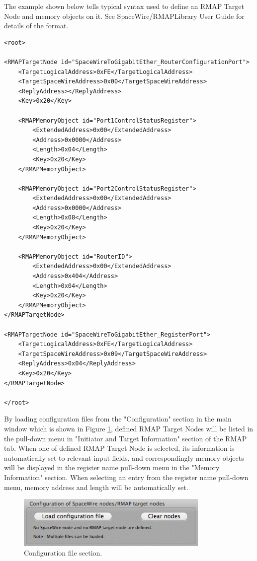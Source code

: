 \documentclass[a4paper,10pt]{article}
\begin{document}
The example shown below tells typical syntax used to define an RMAP Target Node and memory objects on it.  See SpaceWire/RMAPLibrary User Guide for details of the format.

\begin{lstlisting}[label=source:xml_configurationfile_example, caption=An example of an XML-like configuration file.]
<root>

<RMAPTargetNode id="SpaceWireToGigabitEther_RouterConfigurationPort">
	<TargetLogicalAddress>0xFE</TargetLogicalAddress>
	<TargetSpaceWireAddress>0x00</TargetSpaceWireAddress>
	<ReplyAddress></ReplyAddress>
	<Key>0x20</Key>

	<RMAPMemoryObject id="Port1ControlStatusRegister">
		<ExtendedAddress>0x00</ExtendedAddress>
		<Address>0x0000</Address>
		<Length>0x04</Length>
		<Key>0x20</Key>
	</RMAPMemoryObject>

	<RMAPMemoryObject id="Port2ControlStatusRegister">
		<ExtendedAddress>0x00</ExtendedAddress>
		<Address>0x0000</Address>
		<Length>0x08</Length>
		<Key>0x20</Key>
	</RMAPMemoryObject>

	<RMAPMemoryObject id="RouterID">
		<ExtendedAddress>0x00</ExtendedAddress>
		<Address>0x404</Address>
		<Length>0x04</Length>
		<Key>0x20</Key>
	</RMAPMemoryObject>
</RMAPTargetNode>

<RMAPTargetNode id="SpaceWireToGigabitEther_RegisterPort">
	<TargetLogicalAddress>0xFE</TargetLogicalAddress>
	<TargetSpaceWireAddress>0x09</TargetSpaceWireAddress>
	<ReplyAddress>0x04</ReplyAddress>
	<Key>0x20</Key>	
</RMAPTargetNode>

</root>
\end{lstlisting}

By loading configuration files from the "Configuration" section in the main window which is shown in Figure \ref{figure:section_ConfigurationFiles}, defined RMAP Target Nodes will be listed in the pull-down menu in "Initiator and Target Information" section of the RMAP tab. When one of defined RMAP Target Node is selected, its information is automatically set to relevant input fields, and correspondingly memory objects will be displayed in the register name pull-down menu in the "Memory Information" section. When selecting an entry from the register name pull-down menu, memory address and length will be automatically set.
\begin{figure}[htb]
\begin{center}
\includegraphics[height=2.5cm]{figures/SpaceWireRMAPGUI/Section_LoadConfigurationFile.png}
\caption{Configuration file section.}
\label{figure:section_ConfigurationFiles}
\end{center}
\end{figure}
\end{document}
